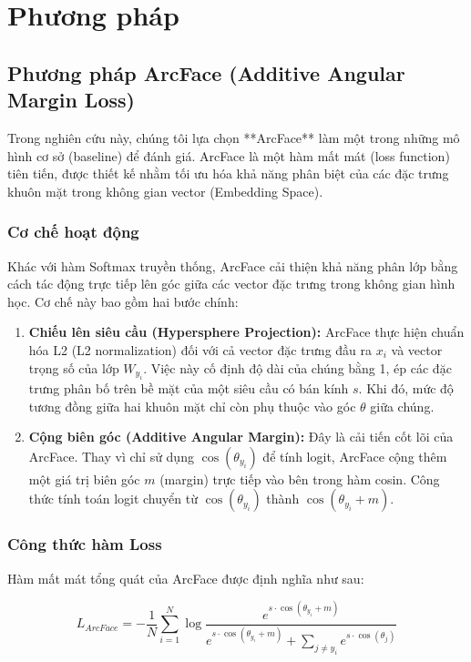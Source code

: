 \chapter{Phương pháp}
\section{Phương pháp ArcFace (Additive Angular Margin Loss)}

Trong nghiên cứu này, chúng tôi lựa chọn **ArcFace** làm một trong những mô hình cơ sở (baseline) để đánh giá. ArcFace là một hàm mất mát (loss function) tiên tiến, được thiết kế nhằm tối ưu hóa khả năng phân biệt của các đặc trưng khuôn mặt trong không gian vector (Embedding Space).

\subsection{Cơ chế hoạt động}
Khác với hàm Softmax truyền thống, ArcFace cải thiện khả năng phân lớp bằng cách tác động trực tiếp lên góc giữa các vector đặc trưng trong không gian hình học. Cơ chế này bao gồm hai bước chính:

\begin{enumerate}
    \item \textbf{Chiếu lên siêu cầu (Hypersphere Projection):} 
    ArcFace thực hiện chuẩn hóa L2 (L2 normalization) đối với cả vector đặc trưng đầu ra $x_i$ và vector trọng số của lớp $W_{y_i}$. Việc này cố định độ dài của chúng bằng 1, ép các đặc trưng phân bố trên bề mặt của một siêu cầu có bán kính $s$. Khi đó, mức độ tương đồng giữa hai khuôn mặt chỉ còn phụ thuộc vào góc $\theta$ giữa chúng.
    
    \item \textbf{Cộng biên góc (Additive Angular Margin):} 
    Đây là cải tiến cốt lõi của ArcFace. Thay vì chỉ sử dụng $\cos(\theta_{y_i})$ để tính logit, ArcFace cộng thêm một giá trị biên góc $m$ (margin) trực tiếp vào bên trong hàm cosin. Công thức tính toán logit chuyển từ $\cos(\theta_{y_i})$ thành $\cos(\theta_{y_i} + m)$.
\end{enumerate}

\subsection{Công thức hàm Loss}
Hàm mất mát tổng quát của ArcFace được định nghĩa như sau:

\begin{equation}
    L_{ArcFace} = -\frac{1}{N} \sum_{i=1}^{N} \log \frac{e^{s \cdot \cos(\theta_{y_i} + m)}}{e^{s \cdot \cos(\theta_{y_i} + m)} + \sum_{j \neq y_i} e^{s \cdot \cos(\theta_j)}}
\end{equation}

